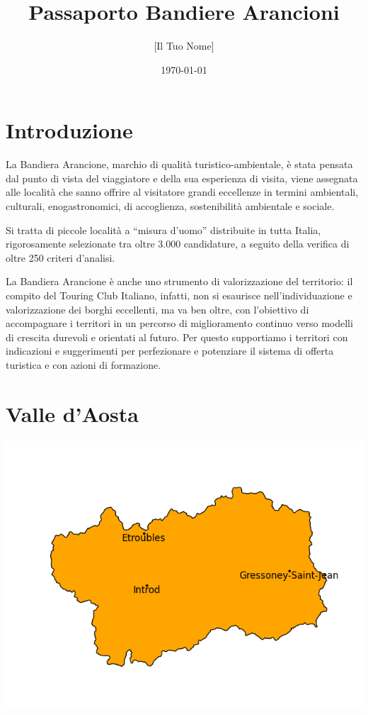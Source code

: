 \documentclass[a5paper,12pt]{article}
\title{Passaporto Bandiere Arancioni}
\author{[Il Tuo Nome]}
\date{\today}
\begin{document}
\maketitle

\newpage

\section*{Introduzione}
La Bandiera Arancione, marchio di qualità turistico-ambientale, è stata pensata dal punto di vista del viaggiatore e della sua esperienza di visita, viene assegnata alle località che sanno offrire al visitatore grandi eccellenze in termini ambientali, culturali, enogastronomici, di accoglienza, sostenibilità ambientale e sociale.

Si tratta di piccole località a “misura d’uomo” distribuite in tutta Italia, rigorosamente selezionate tra oltre 3.000 candidature, a seguito della verifica di oltre 250 criteri d’analisi.

La Bandiera Arancione è anche uno strumento di valorizzazione del territorio: il compito del Touring Club Italiano, infatti, non si esaurisce nell’individuazione e valorizzazione dei borghi eccellenti, ma va ben oltre, con l’obiettivo di accompagnare i territori in un percorso di miglioramento continuo verso modelli di crescita durevoli e orientati al futuro. Per questo supportiamo i territori con indicazioni e suggerimenti per perfezionare e potenziare il sistema di offerta turistica e con azioni di formazione.

\newpage

\section*{Valle d'Aosta}

\begin{center} %
	\includegraphics[width=\linewidth]{"Immagini Regione/Valle d'Aosta.png"} %
\end{center}
\end{document}
